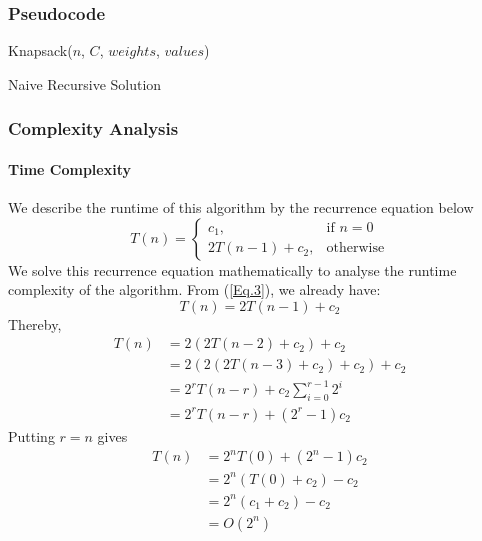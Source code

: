 \documentclass{article}
\begin{document}
\subsubsection{Pseudocode}
\begin{algorithm}[H]
\SetAlgoLined
{}
Knapsack($n$, $C$, $weights$, $values$) \\
 \caption{Naive Recursive Solution}
\end{algorithm}

\subsubsection{Complexity Analysis}
\paragraph{Time Complexity}
We describe the runtime of this algorithm by the recurrence equation below
\begin{equation}
   T(n)=
    \begin{cases}
      c_1, & \text{if $n=0$}\\
      2T(n-1) + c_2, & \text{otherwise}
    \end{cases}       
    \label{Eq.3}
\end{equation}
\indent We solve this recurrence equation mathematically to analyse the runtime  complexity  of  the  algorithm. From (\ref{Eq.3}), we already have:
\begin{equation*}
    T(n) = 2T(n-1) + c_2
\end{equation*}
Thereby,
\begin{equation*}
    \begin{split}
        T(n) & = 2(2T(n-2) + c_2) + c_2 \\
        & = 2(2(2T(n-3) + c_2) + c_2) + c_2 \\
        & =2^r T(n-r) + c_2 \sum_{i=0}^{r-1} 2^i \\
        & = 2^r T(n-r) + (2^r - 1)c_2
    \end{split}
\end{equation*}
Putting $r = n$ gives
\begin{equation*}
    \begin{split}
        T(n) & = 2^n T(0) + (2^n - 1)c_2 \\
        & = 2^n (T(0) + c_2) - c_2 \\
        & = 2^n (c_1 + c_2) - c_2 \\
        & = O(2^n)
    \end{split}
\end{equation*}
\end{document}
